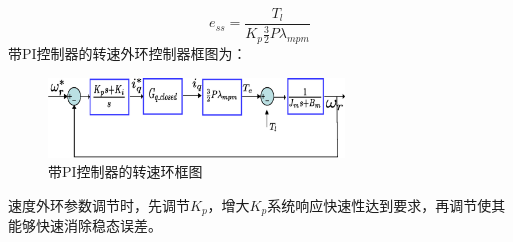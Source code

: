 \begin{equation}\label{eq:steady_state_error}
e_{ss}=\frac{T_{l}}{K_{p}\frac{3}{2}P\lambda_{mpm}}
\end{equation}
带PI控制器的转速外环控制器框图为：
\begin{figure}[H]
	\centering
	\includegraphics[width=0.7\textwidth]{figs/speed_with_PI.eps}
	\caption{带PI控制器的转速环框图}
	\label{fig:speed_with_PI}
\end{figure}
速度外环参数调节时，先调节$K_{p}$，增大$K_{p}$系统响应快速性达到要求，再调节使其能够快速消除稳态误差。
